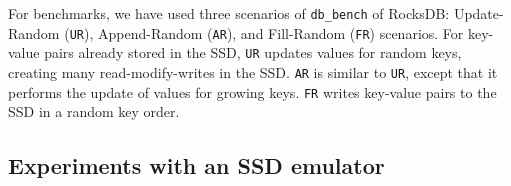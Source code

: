 For benchmarks, we have used three scenarios of \texttt{db\_bench} of RocksDB:
Update-Random (\texttt{UR}), Append-Random (\texttt{AR}), and Fill-Random
(\texttt{FR}) scenarios.  For key-value pairs already stored in the SSD,
\texttt{UR} updates values for random keys, creating many
read-modify-writes in the SSD.  \texttt{AR} is similar to \texttt{UR}, except
that it performs the update of values for growing keys. \texttt{FR} writes
key-value pairs to the SSD in a random key order.

\vspace{-10pt}
\subsection{Experiments with an SSD emulator}

